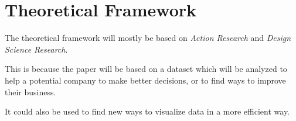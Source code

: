 \section{Theoretical Framework}

The theoretical framework will mostly be based on 
\textit{Action Research} and \textit{Design Science Research}.

This is because the paper will be based on a 
dataset which will be analyzed to help a 
potential company to make better decisions, or 
to find ways to improve their business.

It could also be used to find new ways to visualize
data in a more efficient way.